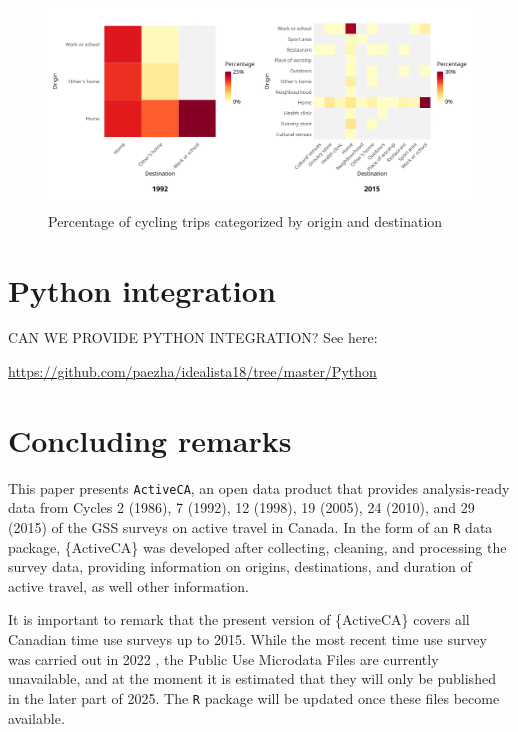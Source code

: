 \documentclass[Royal,times,sageh]{sagej}
\begin{document}
\begin{figure}

{\centering \includegraphics[width=1\linewidth]{Manuscript-figures/cycling_hm_fig} 

}

\caption{Percentage of cycling trips categorized by origin and destination}\label{fig:figure-02}
\end{figure}

\section{Python integration}\label{python-integration}

CAN WE PROVIDE PYTHON INTEGRATION? See here:

\url{https://github.com/paezha/idealista18/tree/master/Python}

\section{Concluding remarks}\label{concluding-remarks}

This paper presents \texttt{ActiveCA}, an open data product that
provides analysis-ready data from Cycles 2 (1986), 7 (1992), 12 (1998),
19 (2005), 24 (2010), and 29 (2015) of the GSS surveys on active travel
in Canada. In the form of an \texttt{R} data package, \{ActiveCA\} was
developed after collecting, cleaning, and processing the survey data,
providing information on origins, destinations, and duration of active
travel, as well other information.

It is important to remark that the present version of \{ActiveCA\}
covers all Canadian time use surveys up to 2015. While the most recent
time use survey was carried out in 2022 \citep{wray2024}, the Public Use
Microdata Files are currently unavailable, and at the moment it is
estimated that they will only be published in the later part of 2025.
The \texttt{R} package will be updated once these files become
available.
\end{document}

